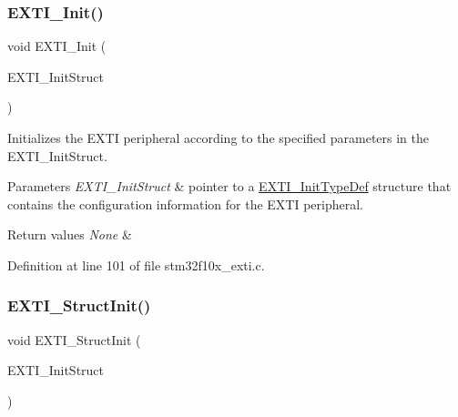 \mbox{\label{group___e_x_t_i___exported___functions_ga8c9ce6352a3a2dfc8fc9287cb24c6501}} 
\subsubsection{\texorpdfstring{E\+X\+T\+I\+\_\+\+Init()}{EXTI\_Init()}}
{\footnotesize\ttfamily void E\+X\+T\+I\+\_\+\+Init (\begin{DoxyParamCaption}\item[{\hyperlink{struct_e_x_t_i___init_type_def}{E\+X\+T\+I\+\_\+\+Init\+Type\+Def} $\ast$}]{E\+X\+T\+I\+\_\+\+Init\+Struct }\end{DoxyParamCaption})}



Initializes the E\+X\+TI peripheral according to the specified parameters in the E\+X\+T\+I\+\_\+\+Init\+Struct. 


\begin{DoxyParams}{Parameters}
{\em E\+X\+T\+I\+\_\+\+Init\+Struct} & pointer to a \hyperlink{struct_e_x_t_i___init_type_def}{E\+X\+T\+I\+\_\+\+Init\+Type\+Def} structure that contains the configuration information for the E\+X\+TI peripheral. \\
\hline
\end{DoxyParams}

\begin{DoxyRetVals}{Return values}
{\em None} & \\
\hline
\end{DoxyRetVals}


Definition at line 101 of file stm32f10x\+\_\+exti.\+c.

\mbox{\label{group___e_x_t_i___exported___functions_ga86b9e662d18a2f829999cfb26aa7ca20}} 
\subsubsection{\texorpdfstring{E\+X\+T\+I\+\_\+\+Struct\+Init()}{EXTI\_StructInit()}}
{\footnotesize\ttfamily void E\+X\+T\+I\+\_\+\+Struct\+Init (\begin{DoxyParamCaption}\item[{\hyperlink{struct_e_x_t_i___init_type_def}{E\+X\+T\+I\+\_\+\+Init\+Type\+Def} $\ast$}]{E\+X\+T\+I\+\_\+\+Init\+Struct }\end{DoxyParamCaption})}



